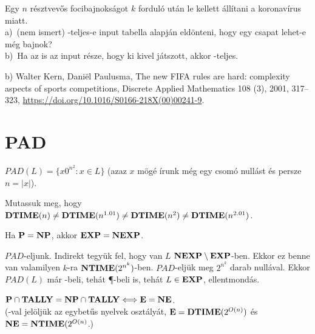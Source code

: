 \begin{Exercise}[counter={sorszam}, difficulty=1]
	Egy $n$ r\'esztvev\H os focibajnoks\'agot $k$ fordul\'o ut\'an le kellett \'all\'itani a koronav\'irus miatt.\\
	a)~\veryhard (nem ismert) \NP-teljes-e input tabella alapj\'an eld\"onteni, hogy egy csapat lehet-e m\'eg bajnok?\\
	b)~\hard Ha az is az input r\'esze, hogy ki kivel j\'atszott, akkor \NP-teljes.
\end{Exercise}	
\begin{Answer}
	b) Walter Kern, Dani\"el Paulusma,
	The new FIFA rules are hard: complexity aspects of sports competitions,
	Discrete Applied Mathematics 108 (3),
	2001, 317--323, \url{https://doi.org/10.1016/S0166-218X(00)00241-9}.
\end{Answer}





\chapter{PAD}

 $PAD(L)=\{x0^{n^2}:x\in L\}$ (azaz $x$ mögé írunk még egy csomó nullást és persze $n=|x|$).

\begin{Exercise}[counter={sorszam}, difficulty=0]
	Mutassuk meg, hogy $\mbox{\ensuremath{\mathbf{DTIME}}}(n)\ne \mbox{\ensuremath{\mathbf{DTIME}}}(n^{1.01})\ne \mbox{\ensuremath{\mathbf{DTIME}}}(n^2)\ne \mbox{\ensuremath{\mathbf{DTIME}}}(n^{2.01})$.
\end{Exercise}	


\begin{Exercise}[counter={sorszam}, difficulty=0]
	Ha $\mbox{\ensuremath{\mathbf{P}}}=\mbox{\ensuremath{\mathbf{NP}}}$, akkor $\mbox{\ensuremath{\mathbf{EXP}}}=\mbox{\ensuremath{\mathbf{NEXP}}}$.
\end{Exercise}	
\begin{Answer}
	$PAD$-eljunk. Indirekt tegy\"uk fel, hogy van $L$ $\mbox{\ensuremath{\mathbf{NEXP}}}\setminus \mbox{\ensuremath{\mathbf{EXP}}}$-ben. Ekkor ez benne van valamilyen $k$-ra $\mbox{\ensuremath{\mathbf{NTIME}}}(2^{n^k})$-ben. $PAD$-elj\"uk meg $2^{n^k}$ darab null\'aval. Ekkor $PAD(L)$ m\'ar \NP-beli, teh\'at \P-beli is, teh\'at $L\in \mbox{\ensuremath{\mathbf{EXP}}}$, ellentmond\'as.
\end{Answer}

\begin{Exercise}[counter={sorszam}, difficulty=0]
	$\mbox{\ensuremath{\mathbf{P}}}\cap\mbox{\ensuremath{\mathbf{TALLY}}}=\mbox{\ensuremath{\mathbf{NP}}}\cap\mbox{\ensuremath{\mathbf{TALLY}}} \Longleftrightarrow\mbox{\ensuremath{\mathbf{E}}}=\mbox{\ensuremath{\mathbf{NE}}}$.\\ (\TALLY-val jelöljük az egybet\H us nyelvek osztályát, $\mbox{\ensuremath{\mathbf{E}}}=\mbox{\ensuremath{\mathbf{DTIME}}}(2^{O(n)})$ \'es $\mbox{\ensuremath{\mathbf{NE}}}=\mbox{\ensuremath{\mathbf{NTIME}}}(2^{O(n)}$.)
\end{Exercise}	

